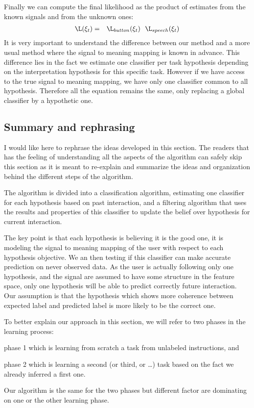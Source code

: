 Finally we can compute the final likelihood as the product of estimates from the known signals and from the unknown ones:
%
\begin{eqnarray}
\L(\xi_t) &=& \L_{button}(\xi_t) ~~ \L_{speech}(\xi_t)
\end{eqnarray}
%
It is very important to understand the difference between our method and a more usual method where the signal to meaning mapping is known in advance. This difference lies in the fact we estimate one classifier per task hypothesis depending on the interpretation hypothesis for this specific task. However if we have access to the true signal to meaning mapping, we have only one classifier common to all hypothesis. Therefore all the equation remains the same, only replacing a global classifier by a hypothetic one.

\subsection{Summary and rephrasing}

I would like here to rephrase the ideas developed in this section. The readers that has the feeling of understanding all the aspects of the algorithm can safely skip this section as it is meant to re-explain and summarize the ideas and organization behind the different steps of the algorithm.

The algorithm is divided into a classification algorithm, estimating one classifier for each hypothesis based on past interaction, and a filtering algorithm that uses the results and properties of this classifier to update the belief over hypothesis for current interaction.

The key point is that each hypothesis is believing it is the good one, it is modeling the signal to meaning mapping of the user with respect to each hypothesis objective. We an then testing if this classifier can make accurate prediction on never observed data. As the user is actually following only one hypothesis, and the signal are assumed to have some structure in the feature space, only one hypothesis will be able to predict correctly future interaction. Our assumption is that the hypothesis which shows more coherence between expected label and predicted label is more likely to be the correct one.

To better explain our approach in this section, we will refer to two phases in the learning process: \begin{inparaenum}[a)] \item phase 1 which is learning from scratch a task from unlabeled instructions, and \item phase 2 which is learning a second (or third, or \ldots) task based on the fact we already inferred a first one. \end{inparaenum} Our algorithm is the same for the two phases but different factor are dominating on one or the other learning phase.

